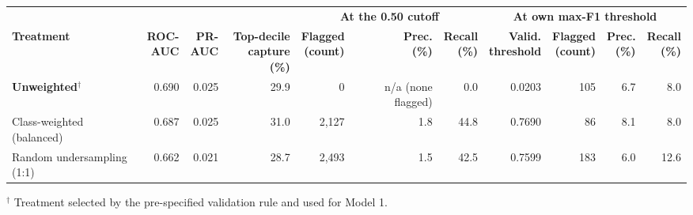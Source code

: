 \documentclass[9pt,letterpaper]{extarticle}
\begin{document}
\begin{center}
\footnotesize
\setlength{\tabcolsep}{3.2pt}
\begin{tabular}{@{}l*{10}{r}@{}}
\toprule
& & & & \multicolumn{3}{c}{\textbf{At the 0.50 cutoff}} & \multicolumn{4}{c}{\textbf{At own max-F1 threshold}} \\
\cmidrule(lr){5-7}\cmidrule(lr){8-11}
\textbf{Treatment} & \shortstack[r]{\textbf{ROC-}\\\textbf{AUC}} & \shortstack[r]{\textbf{PR-}\\\textbf{AUC}} & \shortstack[r]{\textbf{Top-decile}\\\textbf{capture (\%)}} & \shortstack[r]{\textbf{Flagged}\\\textbf{(count)}} & \shortstack[r]{\textbf{Prec.}\\\textbf{(\%)}} & \shortstack[r]{\textbf{Recall}\\\textbf{(\%)}} & \shortstack[r]{\textbf{Valid.}\\\textbf{threshold}} & \shortstack[r]{\textbf{Flagged}\\\textbf{(count)}} & \shortstack[r]{\textbf{Prec.}\\\textbf{(\%)}} & \shortstack[r]{\textbf{Recall}\\\textbf{(\%)}} \\
\midrule
\textbf{Unweighted}$^{\dagger}$ & 0.690 & 0.025 & 29.9 & 0 & n/a (none flagged) & 0.0 & 0.0203 & 105 & 6.7 & 8.0 \\
Class-weighted (balanced) & 0.687 & 0.025 & 31.0 & 2,127 & 1.8 & 44.8 & 0.7690 & 86 & 8.1 & 8.0 \\
Random undersampling (1:1) & 0.662 & 0.021 & 28.7 & 2,493 & 1.5 & 42.5 & 0.7599 & 183 & 6.0 & 12.6 \\
\bottomrule
\end{tabular}
\par\vspace{1pt}\begin{minipage}{\textwidth}\raggedright\scriptsize $^{\dagger}$ Treatment selected by the pre-specified validation rule and used for Model 1.\end{minipage}
\par\vspace{2pt}
\end{center}
\end{document}
